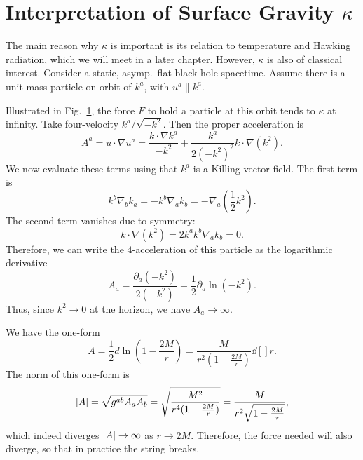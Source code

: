 
\section{Interpretation of \texorpdfstring{Surface Gravity $\kappa$}{Surface Gravity}}%
\label{sec:interpretation_of_surface_gravity}

The main reason why $\kappa$ is important is its relation to temperature and Hawking radiation, which we will meet in a later chapter.
However, $\kappa$ is also of classical interest.
Consider a static, asymp.~flat black hole spacetime. Assume there is a unit mass particle on orbit of $k^{a}$, with $u^{a} \parallel k^{a}$.
\begin{figure}[tbph]
    \centering
    \caption{}
    \label{fig:l18f1}
\end{figure}
Illustrated in Fig.~\ref{fig:l18f1}, the force $F$ to hold a particle at this orbit tends to $\kappa$ at infinity.
Take four-velocity $k^{a} / \sqrt{-k^2}$. Then the proper acceleration is
\begin{equation}
  A^{a} = u \cdot \nabla u^{a} = \frac{k \cdot \nabla k^{a}}{-k^2} + \frac{k^{a}}{2 (-k^2)^2} k \cdot \nabla (k^2).
\end{equation}
We now evaluate these terms using that $k^{a}$ is a Killing vector field. The first term is
\begin{equation}
  k^{b} \nabla_{b} k_{a} = - k^{b} \nabla_{a} k_{b} = - \nabla_{a} (\frac{1}{2} k^2).
\end{equation}
The second term vanishes due to symmetry:
\begin{equation}
  k \cdot \nabla (k^2) = 2 k^{a} k^{b} \nabla_{a} k_{b} = 0.
\end{equation}
Therefore, we can write the $4$-acceleration of this particle as the logarithmic derivative
\begin{equation}
  A_{a} = \frac{\partial_{a} (-k^2)}{2 (-k^2)} = \frac{1}{2} \partial_{a} \ln (-k^2).
\end{equation}
Thus, since $k^2 \to 0 $ at the horizon, we have $A_{a} \to \infty$.
\begin{example}[Schw]
  We have the one-form
  \begin{equation}
    A = \frac{1}{2} d \ln (1 - \frac{2M}{r}) = \frac{M}{r^2 \left( 1 - \frac{2M}{r} \right)} \dd[]{r}.
  \end{equation}
  The norm of this one-form is
  \begin{equation}
    \abs{A} = \sqrt{g^{ab} A_{a} A_{b}} = \sqrt{\frac{M^2}{r^4 (1 - \frac{2M}{r})}} = \frac{M}{r^2 \sqrt{1 - \frac{2M}{r}}},
  \end{equation}
  which indeed diverges $\abs{A} \to \infty$ as $r \to 2M$.
  Therefore, the force needed will also diverge, so that in practice the string breaks.
\end{example}

